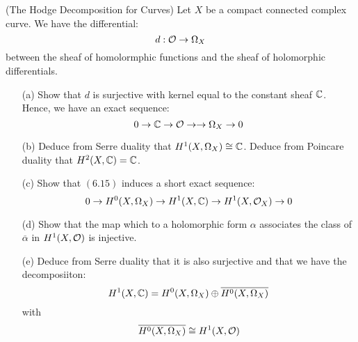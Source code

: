 \documentclass[12pt]{article}
\begin{document}
\newpage








\begin{problem}{3}(The Hodge Decomposition for Curves)
    Let $X$ be a compact connected complex curve. We have the differential:
    \[d: \mathcal{O} \to \Omega_X\]
    between the sheaf of homolormphic functions and the sheaf of holomorphic differentials.
    \begin{enumerate}
        \item[(a)] Show that $d$ is surjective with kernel equal to the constant sheaf $\mathbb C$. Hence, we have an exact sequence: 
        \[ 0 \to \mathbb C \to \mathcal{O} \rightarrow \to \Omega_X \to 0\]
        \item[(b)] Deduce from Serre duality that $H^1(X, \Omega_X) \cong \mathbb C$. Deduce from Poincare duality that $H^2(X, \mathbb C) = \mathbb C$. 
        \item[(c)] Show that $(6.15)$ induces a short exact sequence: 
        \[ 0 \to H^0(X, \Omega_X) \to H^1(X, \mathbb C) \to H^1(X, \mathcal{O}_X) \to 0\]
        \item[(d)] Show that the map which to a holomorphic form $\alpha$ associates the class of $\overline{\alpha}$ in $H^1(X, \mathcal{O})$ is injective.
        \item[(e)] Deduce from Serre duality that it is also surjective and that we have the decomposiiton: 
        \[ H^1(X, \mathbb C) = H^0(X, \Omega_X) \oplus \overline{H^0(X, \Omega_X)}\]
        with 
        \[ \overline{H^0(X, \Omega_X)} \cong H^1(X, \mathcal{O})\]
    \end{enumerate}

\end{problem}
\begin{solution}
\end{solution}
\newpage

\begin{problem}{4}

\end{problem}
\begin{solution}
\end{solution}
\newpage
\end{document}
